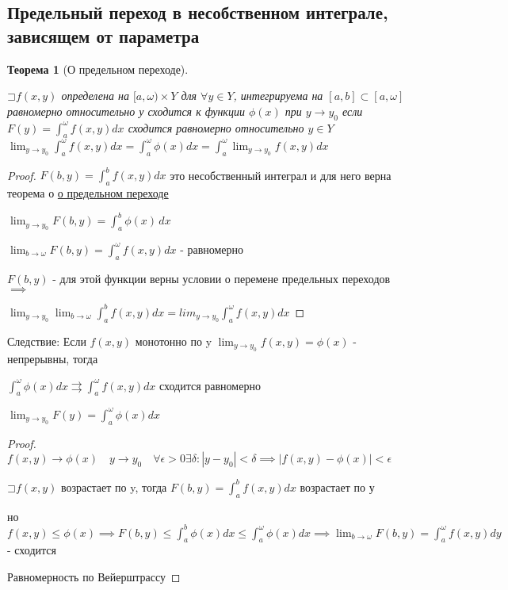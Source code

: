 \documentclass[a4paper]{article}
\newcommand\letsymbol{\mathord{\sqsupset}}
\newtheorem{theorem}{Теорема}[section]
\theoremstyle{definition}
\theoremstyle{remark}
\begin{document}
    \subsection{	Предельный переход в несобственном интеграле, зависящем от параметра}
    \begin{theorem}[О предельном переходе] \hypertarget{p4}{}
     $\letsymbol{}f(x,y)$ определена на $[a,\omega)\times Y$ для $\forall y\in Y$, интегрируема на $[a,b]\subset[a, \omega]$ равномерно относительно у сходится к функции $\phi(x)$ при $y\to y_0$ если $F(y) = \int_a^\omega f(x,y)dx$ 
     сходится равномерно относительно $y\in Y$
     $\lim_{y \to y_0}  \int_a^\omega  f(x,y)dx = \int_a^\omega  \phi(x)dx = \int_a^\omega  \lim_{y \to y_0}  f(x,y)dx$ 
\end{theorem}

\begin{proof}
     $F(b, y) = \int_a^b f(x,y)dx$ это несобственный интеграл и для него верна теорема о \hyperlink{p2}{о предельном переходе}

     $\lim_{y \to y_0}F(b, y) = \int_{a}^{b} \phi(x) \,dx $

     $\lim_{b\to \omega}F(b, y) = \int_a^\omega f(x,y)dx$ - равномерно

     $F(b,y)$ - для этой функции верны условии о перемене предельных переходов $\implies$

     $\lim_{y \to y_0} \lim_{b \to \omega} \int_a^b f(x,y)dx = lim_{y \to y_0} \int_a^\omega f(x,y)dx$
\end{proof}
Следствие:
Если $f(x,y)$ монотонно по y $\lim_{y \to y_0}  f(x,y) = \phi(x)$ - непрерывны, тогда

$\int_a^\omega \phi(x)dx\rightrightarrows\int_a^\omega f(x,y)dx$ сходится равномерно

$\lim_{y \to y_0} F(y) = \int_a^\omega \phi(x)dx$
\begin{proof}
     $f(x,y)\to \phi(x)\quad y\to y_0 \quad \forall\epsilon>0\exists\delta: |y - y_0|< \delta\implies |f(x,y) - \phi(x)|< \epsilon$

     $\letsymbol{} f(x,y)$ возрастает по y, тогда $F(b, y) = \int_a^b f(x,y)dx$ возрастает по у

     но $f(x,y)\leq\phi(x)\implies F(b, y)\leq \int_a^b \phi(x)dx \leq \int_a^\omega \phi(x)dx\implies \lim_{b \to \omega} F(b,y) = \int_a^\omega f(x,y)dy$ - сходится

     Равномерность по Вейерштрассу
\end{proof}
\end{document}

